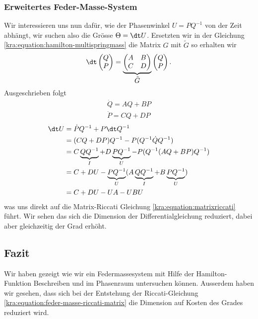 \subsubsection{Erweitertes Feder-Masse-System}
Wir interessieren uns nun dafür, wie der Phasenwinkel $U = PQ^{-1}$ von der Zeit abhängt,
wir suchen also die Grösse $\Theta = \dt U$.
Ersetzten wir in der Gleichung \eqref{kra:equation:hamilton-multispringmass} die Matrix $G$ mit $\tilde{G}$ so erhalten wir
\begin{equation}
    \dt
    \begin{pmatrix}
        Q \\
        P
    \end{pmatrix}
    =
    \underbrace{
        \begin{pmatrix}
            A & B \\
            C & D
        \end{pmatrix}
    }_{\displaystyle{\tilde{G}}}
    \begin{pmatrix}
        Q \\
        P
    \end{pmatrix}.
\end{equation}
Ausgeschrieben folgt
\begin{align*}
    \dot{Q} = AQ + BP \\
    \dot{P} = CQ + DP
\end{align*}
\begin{equation}
    \label{kra:equation:feder-masse-riccati-matrix}
    \begin{split}
        \dt U   &= \dot{P} Q^{-1} + P \dt Q^{-1} \\
        &= (CQ + DP) Q^{-1} - P (Q^{-1} \dot{Q} Q^{-1}) \\
        &= C\underbrace{QQ^{-1}}_\text{$I$} + D\underbrace{PQ^{-1}}_\text{$U$} - P(Q^{-1} (AQ + BP) Q^{-1}) \\
        &= C + DU - \underbrace{PQ^{-1}}_\text{$U$}(A\underbrace{QQ^{-1}}_\text{$I$} + B\underbrace{PQ^{-1}}_\text{$U$}) \\
        &= C  + DU - UA - UBU
    \end{split}
\end{equation}
was uns direkt auf die Matrix-Riccati Gleichung \eqref{kra:equation:matrixriccati} führt.
Wir sehen das sich die Dimension der Differentialgleichung reduziert, dabei aber gleichzeitig der Grad erhöht.

\subsection{Fazit}
Wir haben gezeigt wie wir ein Federmassesystem mit Hilfe der Hamilton-Funktion Beschreiben und im Phasenraum untersuchen können.
Ausserdem haben wir gesehen, dass sich bei der Entstehung der Riccati-Gleichung \eqref{kra:equation:feder-masse-riccati-matrix} die Dimension auf Kosten des Grades reduziert wird.